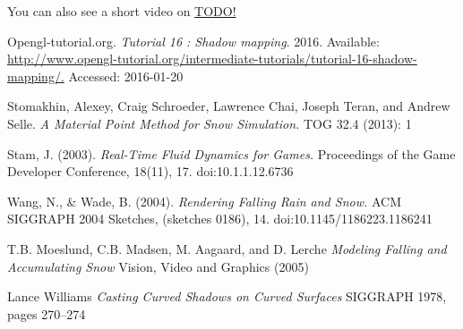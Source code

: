 \documentclass[a4paper,12pt]{article}
\begin{document}
You can also see a short video on \href{YouTube}{TODO!}

\newpage

\begin{thebibliography}{9}
    Opengl-tutorial.org.
    \emph{Tutorial 16 : Shadow mapping}.
    2016.
    Available: \url{http://www.opengl-tutorial.org/intermediate-tutorials/tutorial-16-shadow-mapping/.}
    Accessed: 2016-01-20

    Stomakhin, Alexey, Craig Schroeder, Lawrence Chai, Joseph Teran, and Andrew Selle.
    \emph{A Material Point Method for Snow Simulation.}
    TOG 32.4 (2013): 1

    Stam, J. (2003).
    \emph{Real-Time Fluid Dynamics for Games.}
    Proceedings of the Game Developer Conference, 18(11), 17. doi:10.1.1.12.6736

    Wang, N., \& Wade, B. (2004).
    \emph{Rendering Falling Rain and Snow.}
    ACM SIGGRAPH 2004 Sketches, (sketches 0186), 14. doi:10.1145/1186223.1186241

    T.B. Moeslund, C.B. Madsen, M. Aagaard, and D. Lerche
    \emph{Modeling Falling and Accumulating Snow}
    Vision, Video and Graphics (2005)

    Lance Williams
    \emph{Casting Curved Shadows on Curved Surfaces}
    SIGGRAPH 1978, pages 270–274

\end{thebibliography}
\end{document}
